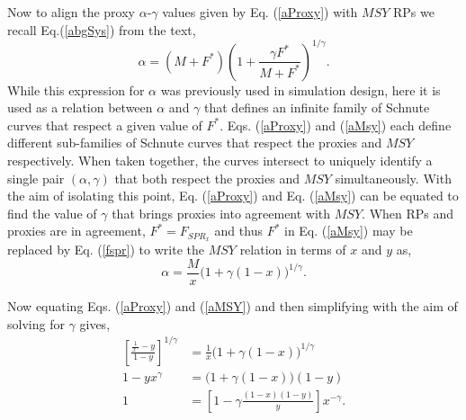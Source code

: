
%
Now to align the proxy $\alpha$-$\gamma$ values given by Eq. (\ref{aProxy}) 
with $MSY$ RPs we recall Eq.(\ref{abgSys}) from the text,
\begin{equation}
\alpha = (M+F^*)\left(1+\frac{\gamma F^*}{M+F^*}\right)^{1/\gamma}. \label{aMsy}
\end{equation}
While this expression for $\alpha$ was previously used in simulation design, 
here it is used as a relation between $\alpha$ and $\gamma$ that defines an 
infinite family of Schnute curves that respect a given value of $F^*$. 
Eqs. (\ref{aProxy}) and (\ref{aMsy}) each define different sub-families of 
Schnute curves that respect the proxies and $MSY$ respectively. When taken together,
the curves intersect to uniquely identify a single pair $(\alpha, \gamma)$ that
both respect the proxies and $MSY$ simultaneously. With the aim of isolating this point, 
Eq. (\ref{aProxy}) and Eq. (\ref{aMsy}) can be equated to find the 
value of $\gamma$ that brings proxies into agreement with $MSY$. When RPs and 
proxies are in agreement, $F^*=F_{SPR_x}$ and thus $F^*$ in Eq. (\ref{aMsy})  
may be replaced by Eq. (\ref{fspr}) to write the $MSY$ relation in terms of $x$ and $y$ as, 
\begin{equation}
\alpha = \frac{M}{x}\Big(1+\gamma(1-x)\Big)^{1/\gamma} \label{aMSY}.
\end{equation}
 


%
Now equating Eqs. (\ref{aProxy}) and (\ref{aMSY}) and then simplifying with the aim of solving for $\gamma$ gives,
%
\begin{align*}
\left[ \frac{\frac{1}{x^\gamma}-y}{1-y} \right]^{1/\gamma} &= \frac{1}{x}\Big(1+\gamma(1-x)\Big)^{1/\gamma}\\
1-yx^\gamma &= \Big(1+\gamma(1-x)\Big)(1-y)\\
1 &= \left[ 1-\gamma\frac{(1-x)(1-y)}{y}\right]x^{-\gamma}.
\end{align*}

